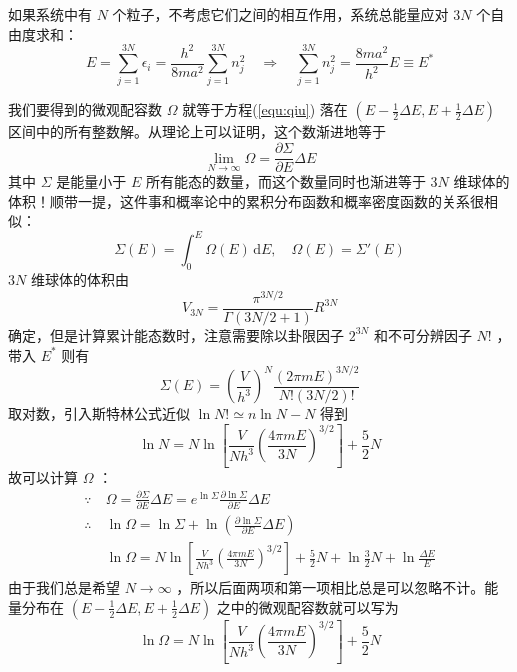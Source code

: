 \documentclass[hyperref,UTF-8]{ctexbook}
\newcommand{\0}{\boldsymbol{0}}
\begin{document}
如果系统中有 $N$ 个粒子，不考虑它们之间的相互作用，系统总能量应对 $3N$ 个自由度求和：
\begin{equation}\label{equ:qiu}
    E = \sum_{j=1}^{3 N} \epsilon_i=\frac{ h^2}{8 m a^2} \sum_{j=1}^{3 N} n_j^2 \quad \Longrightarrow  \quad \sum_{j=1}^{3 N} n_j^2 = \frac{8ma^2}{h^2} E\equiv E^*
\end{equation}

我们要得到的微观配容数 $\Omega$ 就等于方程(\ref*{equ:qiu}) 落在 $(E-\frac{1}{2} \Delta E ,E+\frac{1}{2} \Delta E)$ 区间中的所有整数解。从理论上可以证明，这个数渐进地等于
\begin{equation}\label{equ:lim}
    \lim_{N\rightarrow \infty}\Omega = \frac{\partial \Sigma}{\partial E}\Delta E
\end{equation}
其中 $\Sigma$ 是能量小于 $E$ 所有能态的数量，而这个数量同时也渐进等于 $3N$ 维球体的体积！顺带一提，这件事和概率论中的累积分布函数和概率密度函数的关系很相似：
\[
    \Sigma(E) = \int_{0}^{E}\Omega(E)\,\mathrm dE,\quad \Omega(E) = \Sigma'(E)
\]
 $3N$ 维球体的体积由
\begin{equation}
    V_{3 N}=\frac{\pi^{3 N / 2}}{\Gamma(3 N / 2+1)} R^{3 N}
\end{equation}
确定，但是计算累计能态数时，注意需要除以卦限因子 $2^{3N}$ 和不可分辨因子 $N!$ ，带入 $E^*$ 则有
\begin{equation}
    \Sigma(E)= \left(\frac{V}{h^3} \right)^N \frac{(2\pi mE)^{3N/2}}{N!(3N/2)!} 
\end{equation}
取对数，引入斯特林公式近似 $\ln N! \simeq n\ln N - N$ 得到
\begin{equation}\label{equ:lnN}
    \ln N = N \ln\left[ \frac{V}{N h^3} \left(\frac{4\pi mE}{3N} \right)^{3/2}  \right] + \frac{5}{2} N
\end{equation}
故可以计算 $\Omega$ ：
\begin{align*}
    \because ~& \Omega = \frac{\partial \Sigma}{\partial E}\Delta E = e^{\ln \Sigma} \frac{\partial \ln\Sigma}{\partial E}\Delta E \\
    \therefore~& \ln \Omega = \ln \Sigma + \ln\left(\frac{\partial \ln\Sigma}{\partial E}\Delta E\right) \\
    ~& \ln \Omega = N \ln\left[ \frac{V}{N h^3} \left(\frac{4\pi mE}{3N} \right)^{3/2}  \right] + \frac{5}{2} N + \ln \frac{3}{2} N +\ln \frac{\Delta E}{E} 
\end{align*}
由于我们总是希望 $N\rightarrow \infty$ ，所以后面两项和第一项相比总是可以忽略不计。能量分布在 $(E-\frac{1}{2} \Delta E ,E+\frac{1}{2} \Delta E)$ 之中的微观配容数就可以写为
\begin{equation}
    \ln \Omega = N \ln\left[ \frac{V}{N h^3} \left(\frac{4\pi mE}{3N} \right)^{3/2}  \right] + \frac{5}{2} N 
\end{equation}
\end{document}
